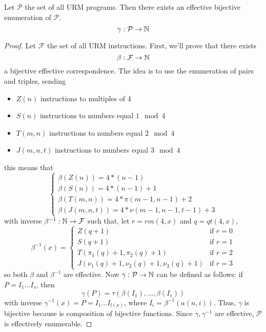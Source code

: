 \begin{theorem}
  Let $\mathcal{P}$ the set of all URM programs. 
  Then there exists an effective bijective enumeration of $\mathcal{P}$.
  \[
    \gamma : \mathcal{P} \to \mathbb{N}
    \]
  \begin{proof}
    Let $\mathcal{F}$ the set of all URM instructions.
    First, we'll prove that there exists
    \[\beta : \mathcal{F} \to \mathbb{N} \]
    a bijective effective correspondence. The idea is to use the
    enumeration of pairs and triples, sending
    \begin{itemize}
    \item $Z(n)$ instructions to multiples of 4
    \item $S(n)$ instructions to numbers equal $ 1 \mod 4$
    \item $T(m,n)$ instructions to numbers equal $2 \mod 4$
    \item $J(m,n,t)$ instructions to numbers equal $3 \mod 4$
    \end{itemize}
    this means that
    \begin{equation*}
      \begin{cases}
        \beta(Z(n)) = 4*(n-1)\\
        \beta(S(n)) = 4*(n-1) + 1\\
        \beta(T(m,n)) = 4*\pi(m-1, n-1) + 2\\
        \beta(J(m,n,t)) = 4*\nu(m-1, n-1, t-1) + 3
      \end{cases}
    \end{equation*}
    with inverse $\beta^{-1} : \mathbb{N} \to \mathcal{F}$ such
    that, let $r = rm(4,x)$ and
    $q = qt(4,x)$,
    \[
      \beta^{-1}(x) = \begin{cases}
        Z(q+1) & \mbox{if } r=0 \\
        S(q+1) & \mbox{if } r=1 \\
        T(\pi_1(q)+1, \pi_2(q)+1) & \mbox{if } r=2 \\
        J(\nu_1(q)+1, \nu_2(q)+1, \nu_3(q)+1) & \mbox{if } r=3
      \end{cases}
    \]
    so both $\beta$ and $\beta^{-1}$ are effective. 
    Now
    $\gamma : \mathcal{P} \to \mathbb{N}$ can be defined as follows:
    if 
    $P = I_1 \dots I_s$, then
    \[\gamma(P) = \tau(\beta(I_1), \dots, \beta(I_s))\]
    with inverse $\gamma^{-1}(x) = P = I_1 \dots I_{l(x)}$, where
    $I_i = \beta ^ {-1} (a (n, i))$.
    Thus, $\gamma$ is bijective because is composition of bijective
    functions. Since $\gamma, \gamma^{-1}$ are effective,
    $\mathcal{P}$ is effectively enumerable.
  \end{proof}
\end{theorem}

